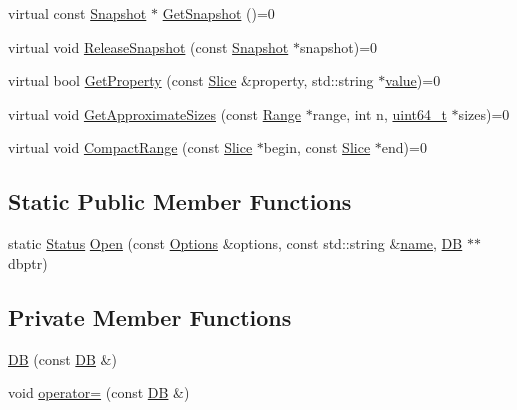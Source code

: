 \begin{DoxyCompactItemize}
\item 
virtual const \hyperlink{classleveldb_1_1_snapshot}{Snapshot} $\ast$ \hyperlink{classleveldb_1_1_d_b_a7d13f6336c7c5f0bf79578d57c45568c}{Get\-Snapshot} ()=0
\item 
virtual void \hyperlink{classleveldb_1_1_d_b_aa46de65e990bd179db0aee770af89144}{Release\-Snapshot} (const \hyperlink{classleveldb_1_1_snapshot}{Snapshot} $\ast$snapshot)=0
\item 
virtual bool \hyperlink{classleveldb_1_1_d_b_afcd557d80bac6668f20372c9e737d807}{Get\-Property} (const \hyperlink{classleveldb_1_1_slice}{Slice} \&property, std\-::string $\ast$\hyperlink{cache_8cc_a0f61d63b009d0880a89c843bd50d8d76}{value})=0
\item 
virtual void \hyperlink{classleveldb_1_1_d_b_ad4d54aa1dbcecc8583b013ab2d67aeff}{Get\-Approximate\-Sizes} (const \hyperlink{structleveldb_1_1_range}{Range} $\ast$range, int n, \hyperlink{stdint_8h_aaa5d1cd013383c889537491c3cfd9aad}{uint64\-\_\-t} $\ast$sizes)=0
\item 
virtual void \hyperlink{classleveldb_1_1_d_b_aeea500cbc6704454b3be6908d5da8b3a}{Compact\-Range} (const \hyperlink{classleveldb_1_1_slice}{Slice} $\ast$begin, const \hyperlink{classleveldb_1_1_slice}{Slice} $\ast$end)=0
\end{DoxyCompactItemize}
\subsection*{Static Public Member Functions}
\begin{DoxyCompactItemize}
\item 
static \hyperlink{classleveldb_1_1_status}{Status} \hyperlink{classleveldb_1_1_d_b_ac1da2b48e911287d86f3a3bfa0f851fe}{Open} (const \hyperlink{structleveldb_1_1_options}{Options} \&options, const std\-::string \&\hyperlink{testharness_8cc_a8f8f80d37794cde9472343e4487ba3eb}{name}, \hyperlink{classleveldb_1_1_d_b}{D\-B} $\ast$$\ast$dbptr)
\end{DoxyCompactItemize}
\subsection*{Private Member Functions}
\begin{DoxyCompactItemize}
\item 
\hyperlink{classleveldb_1_1_d_b_a6997c4b6731ad3946f2ebde601cee6fe}{D\-B} (const \hyperlink{classleveldb_1_1_d_b}{D\-B} \&)
\item 
void \hyperlink{classleveldb_1_1_d_b_a40453450c2e45d58a8e8dc8e00ada17c}{operator=} (const \hyperlink{classleveldb_1_1_d_b}{D\-B} \&)
\end{DoxyCompactItemize}


